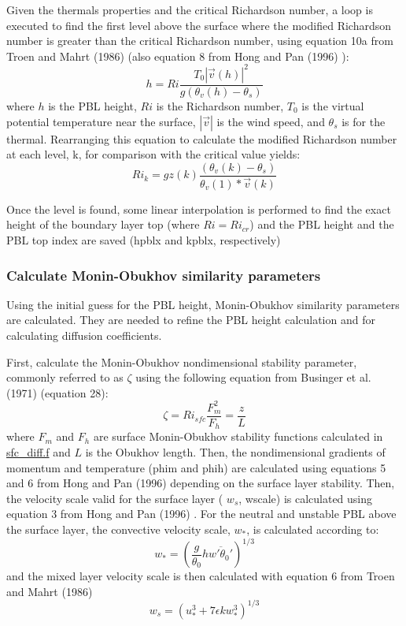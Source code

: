 Given the thermal\textquotesingle{}s properties and the critical Richardson number, a loop is executed to find the first level above the surface where the modified Richardson number is greater than the critical Richardson number, using equation 10a from Troen and Mahrt (1986) \cite{troen_and_mahrt_1986} (also equation 8 from Hong and Pan (1996) \cite{hong_and_pan_1996})\+: \[ h = Ri\frac{T_0\left|\vec{v}(h)\right|^2}{g\left(\theta_v(h) - \theta_s\right)} \] where $h$ is the P\+BL height, $Ri$ is the Richardson number, $T_0$ is the virtual potential temperature near the surface, $\left|\vec{v}\right|$ is the wind speed, and $\theta_s$ is for the thermal. Rearranging this equation to calculate the modified Richardson number at each level, k, for comparison with the critical value yields\+: \[ Ri_k = gz(k)\frac{\left(\theta_v(k) - \theta_s\right)}{\theta_v(1)*\vec{v}(k)} \]

Once the level is found, some linear interpolation is performed to find the exact height of the boundary layer top (where $Ri = Ri_{cr}$) and the P\+BL height and the P\+BL top index are saved (hpblx and kpblx, respectively)

\subsubsection*{Calculate Monin-\/\+Obukhov similarity parameters}

Using the initial guess for the P\+BL height, Monin-\/\+Obukhov similarity parameters are calculated. They are needed to refine the P\+BL height calculation and for calculating diffusion coefficients.

First, calculate the Monin-\/\+Obukhov nondimensional stability parameter, commonly referred to as $\zeta$ using the following equation from Businger et al. (1971) \cite{businger_et_al_1971} (equation 28)\+: \[ \zeta = Ri_{sfc}\frac{F_m^2}{F_h} = \frac{z}{L} \] where $F_m$ and $F_h$ are surface Monin-\/\+Obukhov stability functions calculated in \hyperlink{sfc__diff_8f_source}{sfc\+\_\+diff.\+f} and $L$ is the Obukhov length. Then, the nondimensional gradients of momentum and temperature (phim and phih) are calculated using equations 5 and 6 from Hong and Pan (1996) \cite{hong_and_pan_1996} depending on the surface layer stability. Then, the velocity scale valid for the surface layer ( $w_s$, wscale) is calculated using equation 3 from Hong and Pan (1996) \cite{hong_and_pan_1996}. For the neutral and unstable P\+BL above the surface layer, the convective velocity scale, $w_*$, is calculated according to\+: \[ w_* = \left(\frac{g}{\theta_0}h\overline{w'\theta_0'}\right)^{1/3} \] and the mixed layer velocity scale is then calculated with equation 6 from Troen and Mahrt (1986) \cite{troen_and_mahrt_1986} \[ w_s = (u_*^3 + 7\epsilon k w_*^3)^{1/3} \]

